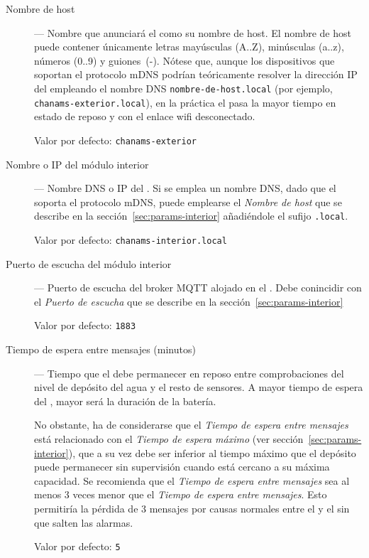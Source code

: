 \begin{description}

  \item[Nombre de host] --- Nombre que anunciará el \MEE como su nombre de host. El nombre de host puede contener únicamente letras mayúsculas (A..Z), minúsculas (a..z), números (0..9) y \mbox{guiones~(-)}. Nótese que, aunque los dispositivos que soportan el protocolo mDNS podrían teóricamente resolver la dirección IP del \ME empleando el nombre DNS \texttt{nombre-de-host\allowbreak.\allowbreak\-lo\-cal} (por ejemplo, \texttt{chanams-exterior.local}), en la práctica el \ME pasa la mayor tiempo en estado de reposo y con el enlace wifi desconectado.
  
  Valor por defecto: \texttt{chanams-exterior}
  
  \item[Nombre o IP del módulo interior] --- Nombre DNS o IP del \MIE. Si se emplea un nombre DNS, dado que el \MEE soporta el protocolo mDNS, puede emplearse el \emph{Nombre de host} que se describe en la sección~\ref{sec:params-interior} añadiéndole el sufijo \texttt{.local}.
  
  Valor por defecto: \texttt{chanams-interior.local}
  
  \item[Puerto de escucha del módulo interior] --- Puerto de escucha del broker MQTT alojado en el \MIE. Debe conincidir con el \emph{Puerto de escucha} que se describe en la sección~\ref{sec:params-interior}

  Valor por defecto: \texttt{1883}
  
  \item[Tiempo de espera entre mensajes (minutos)] --- Tiempo que el \MEE debe permanecer en reposo entre comprobaciones del nivel de depósito del agua y el resto de sensores. A mayor tiempo de espera del \ME, mayor será la duración de la batería.
  
  No obstante, ha de considerarse que el \emph{Tiempo de espera entre mensajes} está relacionado con el \emph{Tiempo de espera máximo} (ver sección~\ref{sec:params-interior}), que a su vez debe ser inferior al tiempo máximo que el depósito puede permanecer sin supervisión cuando está cercano a su máxima capacidad. Se recomienda que el \emph{Tiempo de espera entre mensajes} sea al menos 3 veces menor que el \emph{Tiempo de espera entre mensajes}. Esto permitiría la pérdida de 3 mensajes por causas normales entre el \ME y el \MI sin que salten las alarmas. 

  Valor por defecto: \texttt{5}
   
\end{description}


